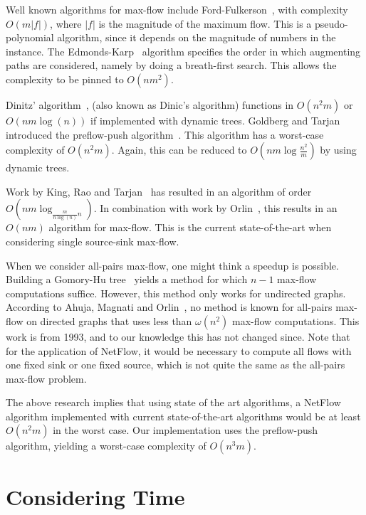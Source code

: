 \documentclass[a4paper,11pt]{book}
\theoremstyle{definition}
\begin{document}
Well known algorithms for max-flow include Ford-Fulkerson~\cite{ford1956maximal},
with complexity $O(m|f|)$, where $|f|$ is the magnitude of the maximum flow. This
is a pseudo-polynomial algorithm, since it depends on the magnitude of numbers
in the instance.
The Edmonds-Karp~\cite{edmonds1972theoretical} algorithm specifies the order in which 
augmenting paths are considered, namely by doing a breath-first search. This allows
the complexity to be pinned to $O(nm^2)$.

Dinitz' algorithm~\cite{dinitz2006dinitz}, (also known as Dinic's algorithm) functions
in $O(n^2m)$ or $O(nm\log(n))$ if implemented with dynamic trees. Goldberg and Tarjan
introduced the preflow-push algorithm~\cite{goldberg1988new}. This algorithm
has a worst-case complexity of $O(n^2m)$. Again, this can be reduced to
$O(nm\log\frac{n^2}{m})$ by using dynamic trees.

Work by King, Rao and Tarjan~\cite{king1992faster} has resulted in an algorithm of
order $O(nm\log_{\frac{m}{n\log(n)}n})$. In combination with work by Orlin~\cite{orlin2013max},
this results in an $O(nm)$ algorithm for max-flow. This is the current state-of-the-art
when considering single source-sink max-flow.

When we consider all-pairs max-flow, one might think a speedup is possible. 
Building a Gomory-Hu tree~\cite{gomory1961multi} yields a method
for which $n-1$ max-flow computations suffice. However, this method only works for undirected graphs.
According to Ahuja, Magnati and Orlin~\cite{ahuja1993network}, no method is known for all-pairs max-flow
on directed graphs that uses less than $\omega(n^2)$ max-flow computations. This work is from
1993, and to our knowledge this has not changed since. Note that for the application of
NetFlow, it would be necessary to compute all flows with one fixed sink or one fixed source,
which is not quite the same as the all-pairs max-flow problem.

The above research implies that using state of the art algorithms, a NetFlow algorithm
implemented with current state-of-the-art algorithms would be at least $O(n^2m)$ in the
worst case. Our implementation uses the preflow-push algorithm, yielding a worst-case
complexity of $O(n^3m)$. 




\chapter{Considering Time}
\label{chap:temporal_pr}
\end{document}
